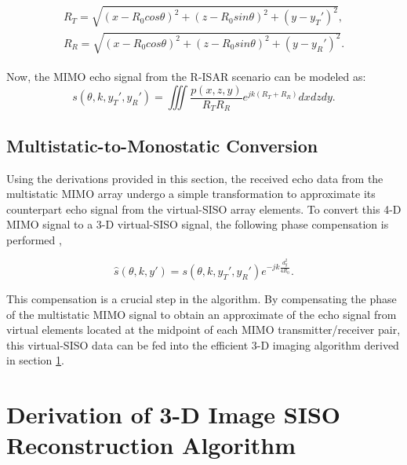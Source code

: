 \documentclass[conference]{IEEEtran}
\begin{document}
		\begin{align}
		\begin{split}
		R_T = \sqrt{(x - R_0 cos\theta)^2 + (z - R_0 sin\theta)^2 + (y - y_T')^2}, \\
		R_R = \sqrt{(x - R_0 cos\theta)^2 + (z - R_0 sin\theta)^2 + (y - y_R')^2}.
		\end{split}
		\end{align}
		
		Now, the MIMO echo signal from the R-ISAR scenario can be modeled as:
		\begin{equation}
		\label{Eq_mimo_echo_signal}
		s(\theta,k,y_T',y_R') = \iiint \frac{p(x,z,y)}{R_T R_R} e^{jk(R_T + R_R)} dx dz dy.
		\end{equation}
		
		
		\subsection{Multistatic-to-Monostatic Conversion}
		\label{Sec_multistatic_to_monostatic_conversion}
		
		Using the derivations provided in this section, the received echo data from the multistatic MIMO array undergo a simple transformation to approximate its counterpart echo signal from the virtual-SISO array elements. To convert this 4-D MIMO signal to a 3-D virtual-SISO signal, the following phase compensation is performed \cite{Yanik:CascadedMIMO},
		
		\begin{equation}
		\label{Eq_phase_compensation}
		\hat{s}(\theta,k,y') = s(\theta,k,y_T',y_R') e^{-jk\frac{d_y^2}{4R_0}}.
		\end{equation}
		
		This compensation is a crucial step in the algorithm. By compensating the phase of the multistatic MIMO signal to obtain an approximate of the echo signal from virtual elements located at the midpoint of each MIMO transmitter/receiver pair, this virtual-SISO data can be fed into the efficient 3-D imaging algorithm derived in section \ref{sec:derivation_3D_siso_algorithm}.
		
		\section{Derivation of 3-D Image SISO Reconstruction Algorithm}
		\label{sec:derivation_3D_siso_algorithm}
			
\end{document}
